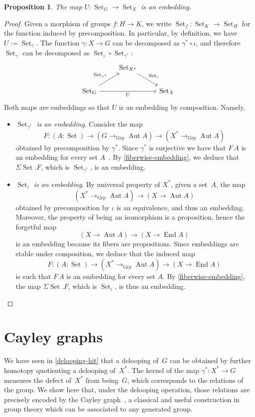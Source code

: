 \documentclass[10pt,a4paper]{amsart}
\newtheorem{proposition}[theorem]{Proposition}
\theoremstyle{definition}
\newcommand{\freegroup}[1]{#1^*} %
\newcommand{\defd}{:=} %
\newcommand{\End}{\operatorname{End}} %
\newcommand{\Aut}{\operatorname{Aut}} %
\newcommand{\incl}{\iota} %
\newcommand{\toGroup}{\to_{\operatorname{Grp}}} %
\newcommand{\Set}{\operatorname{Set}} %
\newcommand{\GSet}[1][G]{\Set_{#1}} %
\newcommand{\XSet}[1][X]{\Set_{#1}} %
\begin{document}
\begin{proposition}
  The map $U:\GSet\to\XSet$ is an embedding.
\end{proposition}
\begin{proof}
Given a morphism of groups $f:H\to K$, we write $\GSet[f]:\GSet[K]\to\GSet[H]$
for the function induced by precomposition. In particular, by definition, we
have $U\defd\GSet[\gamma]$. The function $\gamma:X\to G$ can be decomposed as
$\freegroup\gamma\circ\incl$, and therefore $\GSet[\gamma]$ can be decomposed as
$\GSet[\incl]\circ\GSet[\freegroup\gamma]$:
\[
  \begin{tikzcd}
    &\GSet[\freegroup X]\ar[dr,"{\GSet[\incl]}"]&\\
    \GSet\ar[ur,"{\GSet[\freegroup\gamma]}"]\ar[rr,"U"']&&\XSet
  \end{tikzcd}
\]
Both maps are embeddings so that $U$ is an embedding by composition. Namely,
\begin{itemize}
\item \emph{$\GSet[\freegroup\gamma]$ is an embedding}. Consider the map
  \[
    F:(A:\Set)\to(G\toGroup\Aut A)\to(\freegroup X\toGroup\Aut A)
  \]
  obtained by precomposition by $\freegroup\gamma$. Since $\freegroup\gamma$ is
  surjective we have that $F\,A$ is an
  embedding for every set $A$~\cite[Lemma~10.1.4]{hottbook}. By \cref{fiberwise-embedding}, we
  deduce that $\Sigma\Set.F$, which is $\GSet[\freegroup\gamma]$, is an
  embedding.
\item \emph{$\GSet[\incl]$ is an embedding}. By universal property of $\freegroup X$, given a set~$A$, the map
  \[
    (\freegroup X\toGroup\Aut A)\to(X\to\Aut A)
  \]
  obtained by precomposition by $\incl$ is an equivalence, and thus an
  embedding. Moreover, the property of being an isomorphism is a proposition, hence the forgetful map
  \[
    (X\to\Aut A)\to(X\to\End A)
  \]
  is an embedding because its fibers are propositions. Since embeddings are
  stable under composition, we deduce that the induced map
  \[
    F:(A:\Set)\to(\freegroup X\toGroup\Aut A)\to(X\to\End A)
  \]
  is such that $F\,A$ is an embedding for every set $A$. By
  \cref{fiberwise-embedding}, the map $\Sigma\Set.F$, which is $\GSet[\incl]$, is
  thus an embedding.\qedhere
\end{itemize}  
\end{proof}


\section{Cayley graphs}
\label{cayley}
We have seen in \cref{delooping-hit} that a delooping of~$G$ can be obtained by
further homotopy quotienting a delooping of~$\freegroup X$. The kernel of the
map $\freegroup\gamma:\freegroup X\to G$ measures the defect of~$\freegroup X$
from being~$G$, which corresponds to the relations of the group. We show here
that, under the delooping operation, those relations are precisely encoded by
the Cayley graph~\cite{cayley1878desiderata,lyndon1977combinatorial}, a
classical and useful construction in group theory which can be associated to any
generated group.
\end{document}
